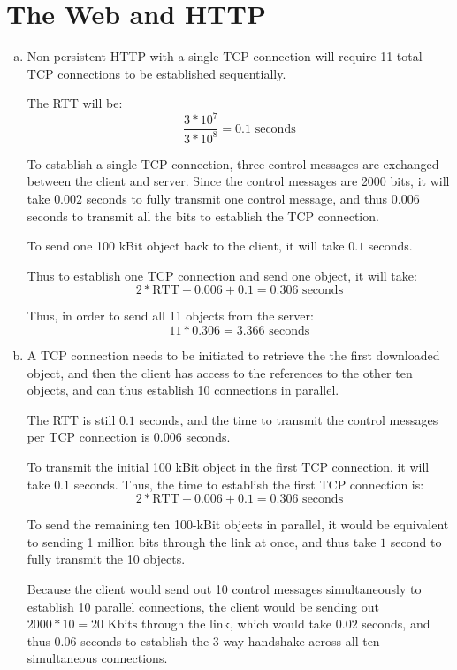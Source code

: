 \documentclass[11pt]{article}
\begin{document}
\section*{The Web and HTTP}
  \begin{enumerate}[(a)]
    \item
      Non-persistent HTTP with a single TCP connection will require 11 total
      TCP connections to be established sequentially.

      The RTT will be:
      \[ \frac{3 * 10^7}{3 * 10^8} = 0.1 \text{ seconds} \]

      To establish a single TCP connection, three control messages are exchanged
      between the client and server. Since the control messages are 2000 bits,
      it will take $0.002$ seconds to fully transmit one control message, and thus
      $0.006$ seconds to transmit all the bits to establish the TCP connection.

      To send one 100 kBit object back to the client, it will take $0.1$ seconds.

      Thus to establish one TCP connection and send one object, it will take:
      \[ 2 * \text{RTT} + 0.006 + 0.1 = 0.306 \text{ seconds} \]

      Thus, in order to send all 11 objects from the server:
      \[ 11 * 0.306 = \boxed{3.366 \text{ seconds}} \]
    \item
      A TCP connection needs to be initiated to retrieve the the first downloaded
      object, and then the client has access to the references to the other ten
      objects, and can thus establish 10 connections in parallel.

      The RTT is still $0.1$ seconds, and the time to transmit the control messages
      per TCP connection is $0.006$ seconds.

      To transmit the initial 100 kBit object in the first TCP connection, it will take
      $0.1$ seconds. Thus, the time to establish the first TCP connection is:
      \[ 2 * \text{RTT} + 0.006 + 0.1 = 0.306 \text{ seconds} \]

      To send the remaining ten 100-kBit objects in parallel, it would be equivalent
      to sending 1 million bits through the link at once, and thus take $1$ second
      to fully transmit the 10 objects.

      Because the client would send out 10 control messages simultaneously to
      establish 10 parallel connections, the client would be sending out
      $2000 * 10 = 20 \text{ Kbits}$ through the link, which would take
      $0.02$ seconds, and thus $0.06$ seconds to establish the 3-way handshake
      across all ten simultaneous connections.


\end{enumerate}
\end{document}
